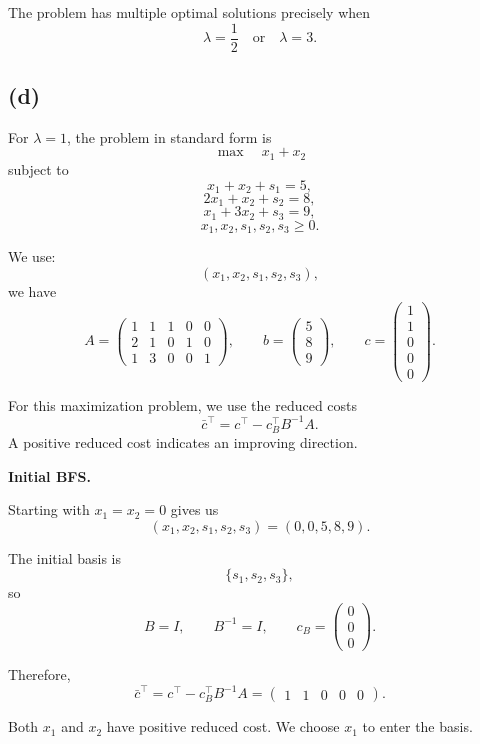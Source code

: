 \documentclass{article}
\begin{document}
The problem has multiple optimal solutions precisely when
\[
\boxed{\lambda=\frac12 \quad\text{or}\quad \lambda=3.}
\]





\vspace{5mm}
\subsection*{(d)}

For $\lambda=1$, the problem in standard form is
\[
\max \quad x_1+x_2
\]
subject to
\[
x_1+x_2+s_1=5,
\]
\[
2x_1+x_2+s_2=8,
\]
\[
x_1+3x_2+s_3=9,
\]
\[
x_1,x_2,s_1,s_2,s_3\geq 0.
\]

We use: 
\[
(x_1,x_2,s_1,s_2,s_3),
\]
we have
\[
A=
\begin{pmatrix}
1&1&1&0&0\\
2&1&0&1&0\\
1&3&0&0&1
\end{pmatrix},
\qquad
b=
\begin{pmatrix}
5\\
8\\
9
\end{pmatrix},
\qquad
c=
\begin{pmatrix}
1\\
1\\
0\\
0\\
0
\end{pmatrix}.
\]

For this maximization problem, we use the reduced costs
\[
\bar c^\top
=
c^\top-c_B^\top B^{-1}A.
\]
A positive reduced cost indicates an improving direction.


\newpage
\textbf{Initial BFS.}

Starting with $x_1=x_2=0$ gives us 
\[
(x_1,x_2,s_1,s_2,s_3)=(0,0,5,8,9).
\]

The initial basis is
\[
\{s_1,s_2,s_3\},
\]
so
\[
B=I,
\qquad
B^{-1}=I,
\qquad
c_B=
\begin{pmatrix}
0\\
0\\
0
\end{pmatrix}.
\]

Therefore,
\[
\bar c^\top
=
c^\top-c_B^\top B^{-1}A
=
\begin{pmatrix}
1&1&0&0&0
\end{pmatrix}.
\]

Both $x_1$ and $x_2$ have positive reduced cost. We choose $x_1$ to
enter the basis.
\end{document}

